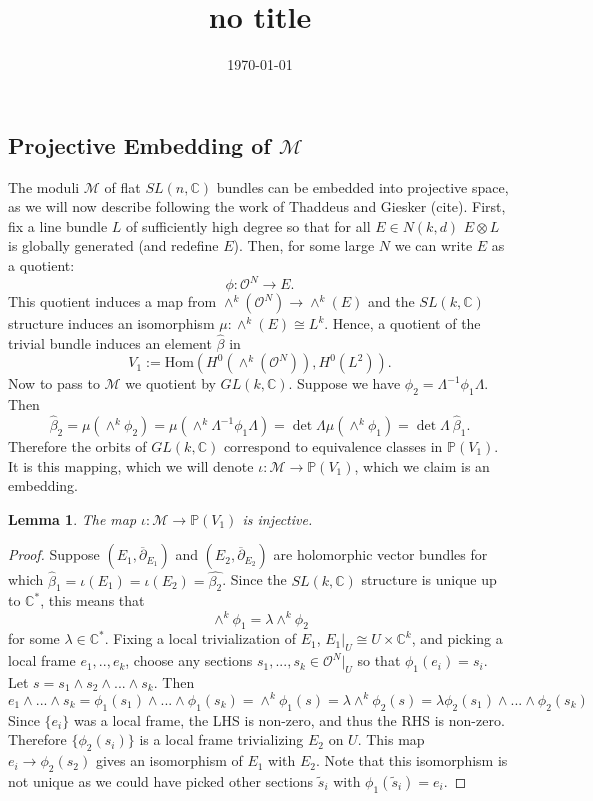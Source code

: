 \documentclass[]{article}
\title{no title}
\date{\today}
\newtheorem{lemma}{Lemma}
\newcommand{\C}{\mathbb{C}}
\newcommand{\Hom}{\text{Hom}}
\newcommand{\OO}{\mathcal{O}}
\newcommand{\MM}{\mathcal{M}}
\newcommand{\dbar}{\overline{\partial}}
\newcommand{\PP}{\mathbb{P}}
\begin{document}
	\subsection{Projective Embedding of $\MM$}
	The moduli $\MM$ of flat $SL(n,\C)$ bundles can be embedded into projective space, as we will now describe following the work of Thaddeus and Giesker (cite). First, fix a line bundle $L$ of sufficiently high degree so that for all $E\in N(k,d)$ $E\otimes L$  is globally generated (and redefine $E$). Then, for some large $N$ we can write $E$ as a quotient:
	\begin{equation}
	\phi:\OO^N \to E.
	\end{equation}
	This quotient induces a map from $\wedge^k(\OO^N) \to \wedge^k(E)$ and the $SL(k,\C)$ structure induces an isomorphism $\mu:\wedge^k(E)\cong L^k$. Hence, a quotient of the trivial bundle induces an element $\hat{\beta}$ in 
	\begin{equation}
	V_1 := \Hom(H^0(\wedge^k(\OO^N)), H^0(L^2)).
	\end{equation}
	Now to pass to $\MM$ we quotient by $GL(k,\C)$. Suppose we have $\phi_2 = \Lambda^{-1} \phi_1 \Lambda$. Then
	\begin{equation}
		\hat{\beta}_2 = \mu(\wedge^k \phi_2) = \mu(\wedge^k \Lambda^{-1}\phi_1 \Lambda) = \det\Lambda \mu(\wedge^k \phi_1) = \det\Lambda~ \hat{\beta}_1.
	\end{equation}
	Therefore the orbits of $GL(k,\C)$ correspond to equivalence classes in $\PP(V_1)$. It is this mapping, which we will denote $\iota:\MM\to \PP(V_1)$, which we claim is an embedding. 
	\begin{lemma}
		The map $\iota:\MM \to \PP(V_1)$ is injective.
	\end{lemma}
	\begin{proof}
		 Suppose $(E_1, \dbar_{E_1})$ and $(E_2, \dbar_{E_2})$ are holomorphic vector bundles for which $\hat{\beta}_1 = \iota(E_1) = \iota(E_2) = \hat{\beta_2}$. Since the $SL(k,\C)$ structure is unique up to $\C^\ast$, this means that
		\begin{equation}
		\wedge^k \phi_1 = \lambda \wedge^k \phi_2
		\end{equation}
		for some $\lambda \in \C^\ast$. Fixing a local trivialization of $E_1$, $E_1|_U \cong U\times \C^k$, and picking a local frame $e_1,..,e_k$, choose any sections $s_1,...,s_k \in \OO^N|_{U}$ so that $\phi_1(e_i) = s_i$. Let $s = s_1 \wedge s_2 \wedge ... \wedge s_k$. Then
		\begin{equation}
		e_1\wedge...\wedge s_k=\phi_1(s_1)\wedge...\wedge \phi_1(s_k)= \wedge^k \phi_1(s) = \lambda \wedge^k \phi_2(s) = \lambda \phi_2(s_1)\wedge...\wedge \phi_2(s_k)
		\end{equation}
		Since $\{e_i\}$ was a local frame, the LHS is non-zero, and thus the RHS is non-zero. Therefore $\{\phi_2(s_i)\}$ is a local frame trivializing $E_2$ on $U$. This map $e_i \to \phi_2(s_2)$ gives an isomorphism of $E_1$ with $E_2$. Note that this isomorphism is not unique as we could have picked other sections $\tilde{s}_i$ with $\phi_1(\tilde{s}_i) = e_i$.
	\end{proof}
\end{document}
